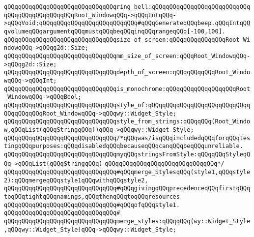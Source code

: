 \newline
\verb|qQQqqQQqqQQqqQQqqQQqqQQqqQQqqQQqring_bell:qQQqqQQqqQQqqQQqqQQqqQQqqQQqqQQqqQQqqQQqqQQqqQQqRoot_WindowqQQq->qQQqIntqQQq->qQQqVoid;qQQqqQQqqQQqqQQqqQQqqQQqqQQq#qQQqGenerateqQQqbeep.qQQqIntqQQqvolumeqQQqargumentqQQqmustqQQqbeqQQqinqQQqrangeqQQq[-100,100].|\newline
\newline
\verb|qQQqqQQqqQQqqQQqqQQqqQQqqQQqqQQqsize_of_screen:qQQqqQQqqQQqqQQqRoot_WindowqQQq->qQQqg2d::Size;|\newline
\verb|qQQqqQQqqQQqqQQqqQQqqQQqqQQqqQQqmm_size_of_screen:qQQqRoot_WindowqQQq->qQQqg2d::Size;|\newline
\verb|qQQqqQQqqQQqqQQqqQQqqQQqqQQqqQQqdepth_of_screen:qQQqqQQqqQQqRoot_WindowqQQq->qQQqInt;|\newline
\newline
\verb|qQQqqQQqqQQqqQQqqQQqqQQqqQQqqQQqis_monochrome:qQQqqQQqqQQqqQQqqQQqRoot_WindowqQQq->qQQqBool;|\newline
\newline
\verb|qQQqqQQqqQQqqQQqqQQqqQQqqQQqqQQqstyle_of:qQQqqQQqqQQqqQQqqQQqqQQqqQQqqQQqqQQqqQQqRoot_WindowqQQq->qQQqwy::Widget_Style;|\newline
\verb|qQQqqQQqqQQqqQQqqQQqqQQqqQQqqQQqstyle_from_strings:qQQqqQQq(Root_Window,qQQqList(qQQqStringqQQq))qQQq->qQQqwy::Widget_Style;|\newline
\newline
\verb|qQQqqQQqqQQqqQQqqQQqqQQqqQQqqQQq/*qQQqwas/isqQQqincludedqQQqforqQQqtestingqQQqpurposes:qQQqdisabledqQQqbecauseqQQqcanqQQqbeqQQqunreliable.|\newline
\verb|qQQqqQQqqQQqqQQqqQQqqQQqqQQqqQQqmyqQQqstringsFromStyle:qQQqqQQqStyleqQQq->qQQqList(qQQqStringqQQq)|\newline
\verb|qQQqqQQqqQQqqQQqqQQqqQQqqQQqqQQq*/|\newline
\newline
\verb|qQQqqQQqqQQqqQQqqQQqqQQqqQQqqQQq#qQQqmerge_StylesqQQq(style1,qQQqstyle2):qQQqmergeqQQqstyle1qQQqwithqQQqstyle2,|\newline
\verb|qQQqqQQqqQQqqQQqqQQqqQQqqQQqqQQq#qQQqgivingqQQqprecedenceqQQqfirstqQQqtoqQQqtightqQQqnamings,qQQqthenqQQqtoqQQqresources|\newline
\verb|qQQqqQQqqQQqqQQqqQQqqQQqqQQqqQQq#qQQqofqQQqstyle1.|\newline
\verb|qQQqqQQqqQQqqQQqqQQqqQQqqQQqqQQq#|\newline
\verb|qQQqqQQqqQQqqQQqqQQqqQQqqQQqqQQqmerge_styles:qQQqqQQq(wy::Widget_Style,qQQqwy::Widget_Style)qQQq->qQQqwy::Widget_Style;|\newline
